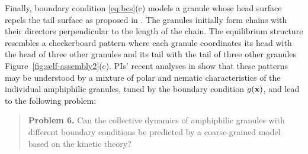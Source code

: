 Finally, boundary condition \eqref{eq:bcs}(c) models 
a granule whose head surface repels the tail surface as proposed in
\cite{MaRa76, Ma77}.
The granules initially form chains with their directors perpendicular to the
length of the chain. The equilibrium structure
resembles a checkerboard pattern
where each granule coordinates
its head with the head of three other granules and its tail with the
tail of three other granules Figure~\ref{fig:self-assembly2}(c).
%
PIs' recent analyses in \cite{fu-ryh-qua-you2022} show that these patterns may be understood by a mixture of polar and nematic characteristics of the individual amphiphilic granules, 
tuned by the boundary condition $g({\bf x})$, and lead to the following problem:
%
\begin{quotation}
  \noindent
  \textbf{Problem 6.} Can the collective dynamics of amphiphilic granules with different boundary conditions 
be predicted by a coarse-grained model based on the kinetic theory?
\end{quotation}


